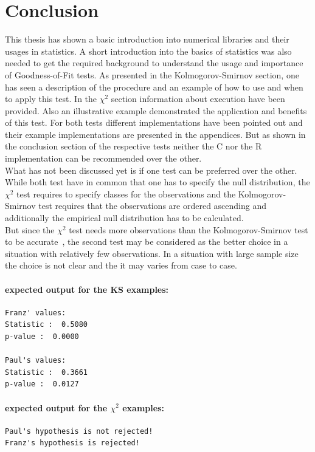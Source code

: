 \documentclass{article}
\theoremstyle{definition}
\begin{document}
\section{Conclusion}
This thesis has shown a basic introduction into numerical libraries and their usages in statistics. A short introduction into the basics of statistics was also needed to get the required background to understand the usage and importance of Goodness-of-Fit tests. As presented in the Kolmogorov-Smirnov section, one has seen a description of the procedure and an example of how to use and when to apply this test. In the $\chi^2$ section information about execution have been provided. Also an illustrative example demonstrated the application and benefits of this test.
For both tests different implementations have been pointed out and their example implementations are presented in the appendices.
But as shown in the conclusion section of the respective tests neither the C nor the R implementation can be recommended over the other.\\
What has not been discussed yet is if one test can be preferred over the other.\\
While both test have in common that one has to specify the null distribution, the $\chi^2$ test requires to specify classes for the observations and the Kolmogorov-Smirnov test requires that the observations are ordered ascending and additionally the empirical null distribution has to be calculated.\\
But since the $\chi^2$ test needs more observations than the Kolmogorov-Smirnov test to be accurate~\cite{knuth2001art}, the second test may be considered as the better choice in a situation with relatively few observations.
In a situation with large sample size the choice is not clear and the it may varies from case to case.
\newpage
\nocite{*}



\begin{appendices}


\paragraph{expected output for the KS examples:}
\begin{verbatim}
Franz' values:
Statistic :  0.5080
p-value :  0.0000

Paul's values:
Statistic :  0.3661
p-value :  0.0127
\end{verbatim}


\paragraph{expected output for the $\chi^2$ examples:}
\begin{verbatim}
Paul's hypothesis is not rejected!
Franz's hypothesis is rejected!
\end{verbatim}
\end{appendices}
\end{document}
